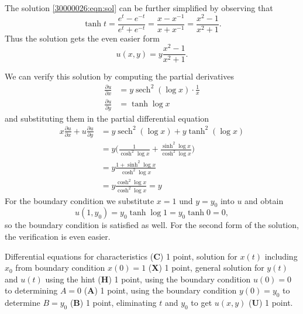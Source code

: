 \begin{loesung}
The solution \eqref{30000026:eqn:sol} can be further simplified
by observing that
\[
\tanh t
=
\frac{e^t-e^{-t}}{e^t+e^{-t}}
= 
\frac{x-x^{-1}}{x+x^{-1}}
=
\frac{x^2-1}{x^2+1}.
\]
Thus the solution gets the even easier form
\[
u(x,y) = y\frac{x^2-1}{x^2+1}.
\]

We can verify this solution by computing the partial derivatives
\begin{align*}
\frac{\partial u}{\partial x}
&=
y\operatorname{sech}^2(\log x)\cdot \frac{1}{x}
\\
\frac{\partial u}{\partial y}
&=
\tanh\log x
\end{align*}
and substituting them in the partial differential equation
\begin{align*}
x\frac{\partial u}{\partial x}
+
u\frac{\partial u}{\partial y}
&=
y\operatorname{sech}^2(\log x)
+
y\tanh^2(\log x)
\\
&=
y\biggl(
\frac{1}{\cosh^2\log x}
+
\frac{\sinh^2\log x}{\cosh^2\log x}
\biggr)
\\
&=
y\frac{1+\sinh^2\log x}{\cosh^2\log x}
\\
&=
y\frac{\cosh^2\log x}{\cosh^2\log x}
=
y
\end{align*}
For the boundary condition we substitute $x=1$ und $y=y_0$ into
$u$ and obtain
\[
u(1,y_0) = y_0\tanh\log 1 = y_0\tanh 0 = 0,
\]
so the boundary condition is satisfied as well.
For the second form of the solution, the verification is even easier.
\end{loesung}

\begin{bewertung}
Differential equations for characteristics ({\bf C}) 1 point,
solution for $x(t)$ including $x_0$ from boundary condition $x(0)=1$
({\bf X}) 1 point,
general solution for $y(t)$ and $u(t)$ using the hint ({\bf H}) 1 point,
using the boundary condition $u(0)=0$ to determining $A=0$ ({\bf A}) 1 point,
using the boundary condition $y(0)=y_0$ to determine $B=y_0$ ({\bf B}) 1 point,
eliminating $t$ and $y_0$ to get $u(x,y)$ ({\bf U}) 1 point.
\end{bewertung}
